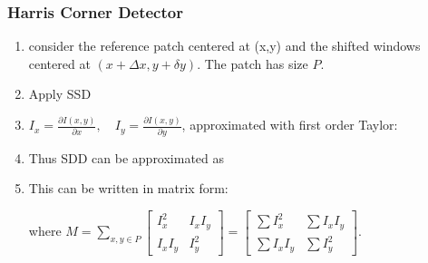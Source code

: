 \documentclass[10pt,a4paper]{scrartcl}
\begin{document}
\begin{multicols*}{2}

\subsubsection{Harris Corner Detector}

\begin{enumerate}
\item consider the reference patch centered at (x,y) and the shifted windows centered at $(x+\Delta x,y+\delta y)$. The patch has size $P$.
\item Apply SSD
\item $I_x=\frac{\partial I(x,y)}{\partial x},\quad I_y=\frac{\partial I(x,y)}{\partial y}$, approximated with first order Taylor:

\item Thus SDD can be approximated as


\item This can be written in matrix form:


where $M=\sum\limits_{x,y\in P}\begin{bmatrix}
I_x^2&I_xI_y\\I_xI_y&I_y^2
\end{bmatrix}=\begin{bmatrix}
\sum I_x^2&\sum I_xI_y\\\sum I_xI_y&\sum I_y^2
\end{bmatrix}$.


\end{enumerate}
\end{multicols*}
\end{document}
